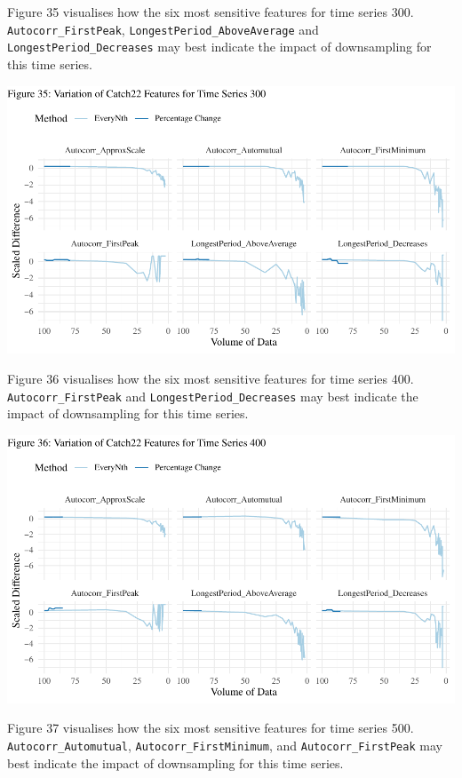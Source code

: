 \documentclass{article}
\begin{document}
Figure 35 visualises how the six most sensitive features for time series
300. \texttt{Autocorr\_FirstPeak}, \texttt{LongestPeriod\_AboveAverage}
and \texttt{LongestPeriod\_Decreases} may best indicate the impact of
downsampling for this time series.

\includegraphics{210431461_CSC8639_Dissertation_files/figure-latex/Catch22Variation300-1.pdf}

Figure 36 visualises how the six most sensitive features for time series
400. \texttt{Autocorr\_FirstPeak} and \texttt{LongestPeriod\_Decreases}
may best indicate the impact of downsampling for this time series.

\includegraphics{210431461_CSC8639_Dissertation_files/figure-latex/Catch22Variation400-1.pdf}

Figure 37 visualises how the six most sensitive features for time series
500. \texttt{Autocorr\_Automutual}, \texttt{Autocorr\_FirstMinimum}, and
\texttt{Autocorr\_FirstPeak} may best indicate the impact of
downsampling for this time series.
\end{document}
